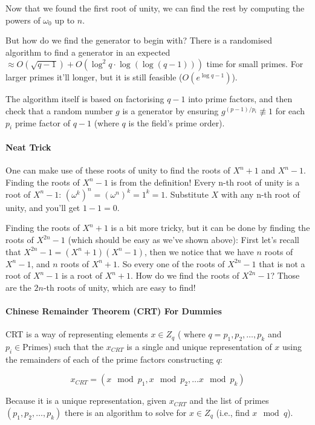 Now that we found the first root of unity,
we can find the rest by computing the powers of $\omega_0$ up to $n$.


But how do we find the generator to begin with? 
There is a randomised algorithm to find a generator in an expected 
$\approx O(\sqrt{q-1})+O(\log^2{q}\cdot \log (\log(q-1)))$ time for small primes.
For larger primes it'll longer, but it is still feasible ($O(e^{\log q-1})$).

The algorithm itself is based on factorising $q-1$ into prime factors, and then
check that a random number $g$ is a generator by ensuring $g^{(p-1)/p_i} \not\equiv 1$
for each $p_i$ prime factor of $q-1$ (where $q$ is the field's prime order).


\paragraph{Neat Trick}
One can make use of these roots of unity to find the roots of $X^n+1$ and $X^n-1$.
Finding the roots of $X^n-1$ is from the definition! 
Every n-th root of unity is a root of $X^n-1$: $(\omega^k)^n=(\omega^n)^k=1^k=1$.
Substitute $X$ with any n-th root of unity, and you'll get $1-1=0$.

Finding the roots of $X^n+1$ is a bit more tricky,
but it can be done by finding the roots of $X^{2n}-1$ (which should be easy
as we've shown above):
First let's recall that $X^{2n}-1=(X^n+1)(X^n-1)$, then we notice that
we have $n$ roots of $X^n-1$,
and $n$ roots of $X^n+1$. So every one of the roots of $X^{2n}-1$ that is
not a root of $X^n-1$ is a root of $X^n+1$.
How do we find the roots of $X^{2n}-1$? Those are the $2n$-th roots of unity, 
which are easy to find!

\paragraph{\bf Chinese Remainder Theorem (CRT) For Dummies}
CRT is a way of representing elements $x\in Z_q$ (
  where $q=p_1,p_2,\dots,p_k$ and $p_i\in\text{Primes}$)
such that the $x_{CRT}$ is a single and unique representation of $x$ using the 
remainders of each of the prime factors constructing $q$:

$$ x_{CRT} = (x\mod p_1, x\mod p_2 ,\dots x\mod p_k ) $$



Because it is a unique representation, given $x_{CRT}$ and the list of
 primes $(p_1,p_2,\dots,p_k)$ there is an algorithm to solve for $x \in Z_q$
 (i.e., find $x \mod q$).


